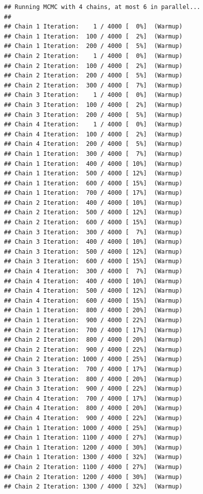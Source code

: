 \documentclass[
]{article}
\begin{document}
\begin{verbatim}
## Running MCMC with 4 chains, at most 6 in parallel...
## 
## Chain 1 Iteration:    1 / 4000 [  0%]  (Warmup) 
## Chain 1 Iteration:  100 / 4000 [  2%]  (Warmup) 
## Chain 1 Iteration:  200 / 4000 [  5%]  (Warmup) 
## Chain 2 Iteration:    1 / 4000 [  0%]  (Warmup) 
## Chain 2 Iteration:  100 / 4000 [  2%]  (Warmup) 
## Chain 2 Iteration:  200 / 4000 [  5%]  (Warmup) 
## Chain 2 Iteration:  300 / 4000 [  7%]  (Warmup) 
## Chain 3 Iteration:    1 / 4000 [  0%]  (Warmup) 
## Chain 3 Iteration:  100 / 4000 [  2%]  (Warmup) 
## Chain 3 Iteration:  200 / 4000 [  5%]  (Warmup) 
## Chain 4 Iteration:    1 / 4000 [  0%]  (Warmup) 
## Chain 4 Iteration:  100 / 4000 [  2%]  (Warmup) 
## Chain 4 Iteration:  200 / 4000 [  5%]  (Warmup) 
## Chain 1 Iteration:  300 / 4000 [  7%]  (Warmup) 
## Chain 1 Iteration:  400 / 4000 [ 10%]  (Warmup) 
## Chain 1 Iteration:  500 / 4000 [ 12%]  (Warmup) 
## Chain 1 Iteration:  600 / 4000 [ 15%]  (Warmup) 
## Chain 1 Iteration:  700 / 4000 [ 17%]  (Warmup) 
## Chain 2 Iteration:  400 / 4000 [ 10%]  (Warmup) 
## Chain 2 Iteration:  500 / 4000 [ 12%]  (Warmup) 
## Chain 2 Iteration:  600 / 4000 [ 15%]  (Warmup) 
## Chain 3 Iteration:  300 / 4000 [  7%]  (Warmup) 
## Chain 3 Iteration:  400 / 4000 [ 10%]  (Warmup) 
## Chain 3 Iteration:  500 / 4000 [ 12%]  (Warmup) 
## Chain 3 Iteration:  600 / 4000 [ 15%]  (Warmup) 
## Chain 4 Iteration:  300 / 4000 [  7%]  (Warmup) 
## Chain 4 Iteration:  400 / 4000 [ 10%]  (Warmup) 
## Chain 4 Iteration:  500 / 4000 [ 12%]  (Warmup) 
## Chain 4 Iteration:  600 / 4000 [ 15%]  (Warmup) 
## Chain 1 Iteration:  800 / 4000 [ 20%]  (Warmup) 
## Chain 1 Iteration:  900 / 4000 [ 22%]  (Warmup) 
## Chain 2 Iteration:  700 / 4000 [ 17%]  (Warmup) 
## Chain 2 Iteration:  800 / 4000 [ 20%]  (Warmup) 
## Chain 2 Iteration:  900 / 4000 [ 22%]  (Warmup) 
## Chain 2 Iteration: 1000 / 4000 [ 25%]  (Warmup) 
## Chain 3 Iteration:  700 / 4000 [ 17%]  (Warmup) 
## Chain 3 Iteration:  800 / 4000 [ 20%]  (Warmup) 
## Chain 3 Iteration:  900 / 4000 [ 22%]  (Warmup) 
## Chain 4 Iteration:  700 / 4000 [ 17%]  (Warmup) 
## Chain 4 Iteration:  800 / 4000 [ 20%]  (Warmup) 
## Chain 4 Iteration:  900 / 4000 [ 22%]  (Warmup) 
## Chain 1 Iteration: 1000 / 4000 [ 25%]  (Warmup) 
## Chain 1 Iteration: 1100 / 4000 [ 27%]  (Warmup) 
## Chain 1 Iteration: 1200 / 4000 [ 30%]  (Warmup) 
## Chain 1 Iteration: 1300 / 4000 [ 32%]  (Warmup) 
## Chain 2 Iteration: 1100 / 4000 [ 27%]  (Warmup) 
## Chain 2 Iteration: 1200 / 4000 [ 30%]  (Warmup) 
## Chain 2 Iteration: 1300 / 4000 [ 32%]  (Warmup) 

\end{verbatim}
\end{document}
